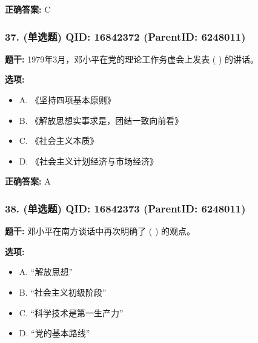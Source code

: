 \documentclass[12pt,UTF8]{ctexart}
\begin{document}
\textbf{正确答案:}
C

\vspace{0.3em}\hrulefill\vspace{0.7em}

\subsubsection*{37. (单选题) \small QID: 16842372 (ParentID: 6248011)}

\textbf{题干:}
1979年3月，邓小平在党的理论工作务虚会上发表 ( ) 的讲话。



\textbf{选项:}
\begin{itemize}[leftmargin=*]

  \item A. 《坚持四项基本原则》

  \item B. 《解放思想实事求是，团结一致向前看》

  \item C. 《社会主义本质》

  \item D. 《社会主义计划经济与市场经济》

\end{itemize}

\textbf{正确答案:}
A

\vspace{0.3em}\hrulefill\vspace{0.7em}

\subsubsection*{38. (单选题) \small QID: 16842373 (ParentID: 6248011)}

\textbf{题干:}
邓小平在南方谈话中再次明确了 ( ) 的观点。



\textbf{选项:}
\begin{itemize}[leftmargin=*]

  \item A. “解放思想”

  \item B. “社会主义初级阶段”

  \item C. “科学技术是第一生产力”

  \item D. “党的基本路线”

\end{itemize}
\end{document}
